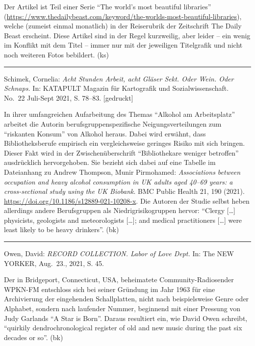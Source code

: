 \documentclass[a4paper,
fontsize=11pt,
oneside,
numbers=noperiodatend,
parskip=half-,
bibliography=totoc,
final
]{scrartcl}
\begin{document}
Der Artikel ist Teil einer Serie \enquote{The world's most beautiful
libraries}
(\url{https://www.thedailybeast.com/keyword/the-worlds-most-beautiful-libraries}),
welche (zumeist einmal monatlich) in der Reiserubrik der Zeitschrift The
Daily Beast erscheint. Diese Artikel sind in der Regel kurzweilig, aber
leider -- ein wenig im Konflikt mit dem Titel -- immer nur mit der
jeweiligen Titelgrafik und nicht noch weiteren Fotos bebildert. (ks)

\begin{center}\rule{0.5\linewidth}{0.5pt}\end{center}

Schimek, Cornelia: \emph{Acht Stunden Arbeit, acht Gläser Sekt. Oder
Wein. Oder Schnaps.} In: KATAPULT Magazin für Kartografik und
Sozialwissenschaft. No.~22 Juli-Sept 2021, S. 78--83. {[}gedruckt{]}

In ihrer umfangreichen Aufarbeitung des Themas \enquote{Alkohol am
Arbeitsplatz} arbeitet die Autorin berufsgruppenspezifische
Neigungsverteilungen zum \enquote{riskanten Konsum} von Alkohol heraus.
Dabei wird erwähnt, dass Bibliotheksberufe empirisch ein vergleichsweise
geringes Risiko mit sich bringen. Dieser Fakt wird in der
Zwischenüberschrift \enquote{Bibliothekare weniger betroffen}
ausdrücklich hervorgehoben. Sie bezieht sich dabei auf eine Tabelle im
Dateianhang zu Andrew Thompson, Munir Pirmohamed: \emph{Associations
between occupation and heavy alcohol consumption in UK adults aged
40--69 years: a cross-sectional study using the UK Biobank}. BMC Public
Health 21, 190 (2021). \url{https://doi.org/10.1186/s12889-021-10208-x}.
Die Autoren der Studie selbst heben allerdings andere Berufsgruppen als
Niedrigrisikogruppen hervor: \enquote{Clergy {[}\ldots{]} physicists,
geologists and meteorologists {[}\ldots{]}; and medical practitioners
{[}\ldots{]} were least likely to be heavy drinkers}. (bk)

\begin{center}\rule{0.5\linewidth}{0.5pt}\end{center}

Owen, David: \emph{RECORD COLLECTION. Labor of Love Dept.} In: The NEW
YORKER, Aug.~23., 2021, S. 45.

Der in Bridgeport, Connecticut, USA, beheimatete Community-Radiosender
WPKN-FM entschloss sich bei seiner Gründung im Jahr 1963 für eine
Archivierung der eingehenden Schallplatten, nicht nach beispielsweise
Genre oder Alphabet, sondern nach laufender Nummer, beginnend mit einer
Pressung von Judy Garlands \enquote{A Star is Born}. Daraus resultiert
ein, wie David Owen schreibt, \enquote{quirkily dendrochronological
register of old and new music during the past six decades or so}. (bk)
\end{document}
